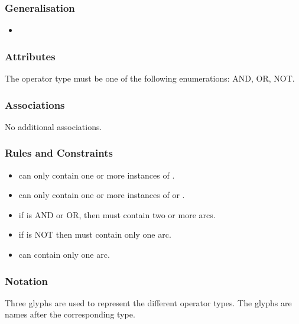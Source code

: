 \subsubsection{Generalisation}

\begin{itemize}
\item {}
\end{itemize}

\subsubsection{Attributes}

\begin{attributes}
   The operator type must be one of the
  following enumerations: AND, OR, NOT.
\end{attributes}

\subsubsection{Associations}

No additional associations.

\subsubsection{Rules and Constraints}

\begin{itemize}
\item {} can only contain one or more instances of
  .
\item {} can only contain one or more instances of
   or .
\item if  is AND or OR, then  must
  contain two or more arcs.
\item if  is NOT then  must
  contain only one arc.
\item {} can contain only one arc.
\end{itemize}

\subsubsection{Notation}

Three glyphs are used to represent the different operator types. The
glyphs are names after the corresponding type.


